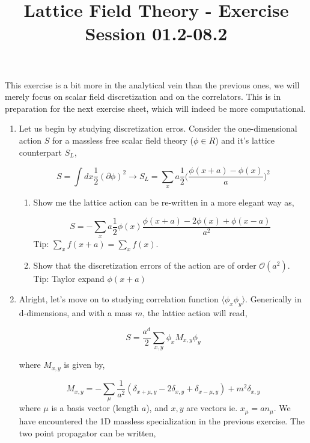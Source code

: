 \documentclass{article}
\title{Lattice Field Theory - Exercise Session 01.2-08.2}
\begin{document}
\maketitle

This exercise is a bit more in the analytical vein than the previous ones, we will merely focus on scalar field discretization and on the correlators. This is in preparation for the next exercise sheet, which will indeed be more computational.

\begin{enumerate}

\item Let us begin by studying discretization erros. Consider the one-dimensional action $S$ for a massless free scalar field theory ($\phi \in R$) and it's lattice counterpart $S_{L}$,

\begin{equation}
S = \int dx \frac{1}{2} (\partial \phi)^2 \rightarrow S_{L} = \sum_x a \frac{1}{2} \bigg( \frac{\phi(x+a) - \phi(x)}{a} \bigg)^2
\end{equation}

\begin{enumerate}

\item Show me the lattice action can be re-written in a more elegant way as,

\begin{equation}
S = - \sum_x a \frac{1}{2} \phi(x) \frac{\phi(x+a) -2\phi(x) + \phi(x-a)}{a^2}
\end{equation}
Tip: $\sum_x f(x+a) = \sum_x f(x)$.

\item Show that the discretization errors of the action are of order $\mathcal{O}(a^2)$. Tip: Taylor expand $\phi(x+a)$

\end{enumerate}

\item Alright, let's move on to studying correlation function $\langle \phi_x \phi_y \rangle$. Generically in d-dimensions, and with a mass $m$, the lattice action will read,


\begin{equation}
 S = \frac{a^d}{2} \sum_{x, y} \phi_x M_{x,y} \phi_y 
\end{equation}

where $M_{x,y}$ is given by,

\begin{equation}
M_{x,y} = -\sum_{\mu} \frac{1}{a^2} (\delta_{x+\mu, y} -2\delta_{x, y} + \delta_{x-\mu, y}) + m^2\delta_{x,y}
\end{equation}
where $\mu$ is a basis vector (length $a$), and $x,y$ are vectors ie. $x_\mu = a n_\mu$. We have encountered the 1D massless specialization in the previous exercise. The two point propagator can be written,


\end{enumerate}
\end{document}
